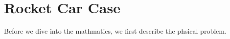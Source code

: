 \chapter{Rocket Car Case}
Before we dive into the mathmatics, we first describe the phsical problem. 
